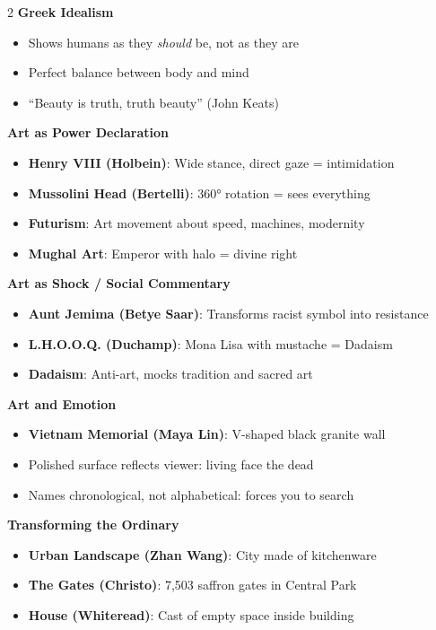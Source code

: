 \documentclass[11pt,letterpaper]{article}
\newcommand{\mysubsection}[1]{%
    \vspace{-0.2em}
    {\bfseries\color{sectioncolor}#1}%
    \vspace{0.1em}
}
\begin{document}
\begin{multicols*}{2}
\mysubsection{Greek Idealism}
\begin{itemize}[leftmargin=*, noitemsep, topsep=0pt]
    \item Shows humans as they \textit{should} be, not as they are
    \item Perfect balance between body and mind
    \item ``Beauty is truth, truth beauty'' (John Keats)
\end{itemize}

\mysubsection{Art as Power Declaration}
\begin{itemize}[leftmargin=*, noitemsep, topsep=0pt]
    \item \textbf{Henry VIII (Holbein)}: Wide stance, direct gaze = intimidation
    \item \textbf{Mussolini Head (Bertelli)}: 360° rotation = sees everything
    \item \textbf{Futurism}: Art movement about speed, machines, modernity
    \item \textbf{Mughal Art}: Emperor with halo = divine right
\end{itemize}

\mysubsection{Art as Shock / Social Commentary}
\begin{itemize}[leftmargin=*, noitemsep, topsep=0pt]
    \item \textbf{Aunt Jemima (Betye Saar)}: Transforms racist symbol into resistance
    \item \textbf{L.H.O.O.Q. (Duchamp)}: Mona Lisa with mustache = Dadaism
    \item \textbf{Dadaism}: Anti-art, mocks tradition and sacred art
\end{itemize}

\mysubsection{Art and Emotion}
\begin{itemize}[leftmargin=*, noitemsep, topsep=0pt]
    \item \textbf{Vietnam Memorial (Maya Lin)}: V-shaped black granite wall
    \item Polished surface reflects viewer: living face the dead
    \item Names chronological, not alphabetical: forces you to search
\end{itemize}

\mysubsection{Transforming the Ordinary}
\begin{itemize}[leftmargin=*, noitemsep, topsep=0pt]
    \item \textbf{Urban Landscape (Zhan Wang)}: City made of kitchenware
    \item \textbf{The Gates (Christo)}: 7,503 saffron gates in Central Park
    \item \textbf{House (Whiteread)}: Cast of empty space inside building
\end{itemize}


\end{multicols*}
\end{document}
